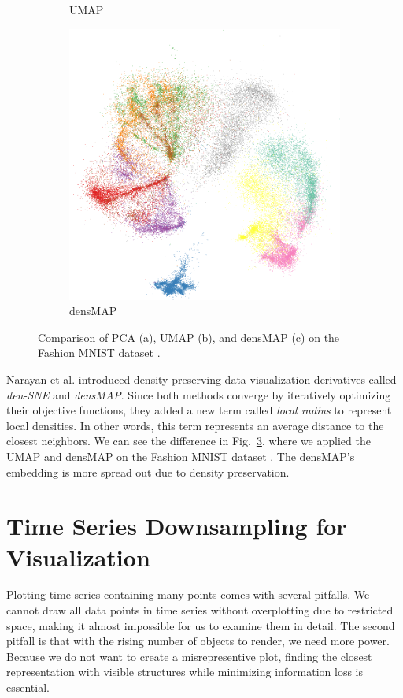 \begin{figure}[ht]
\begin{subfigure}[b]{0.3\textwidth}
        \caption{UMAP}
        \label{fig:fas-umap}
    \end{subfigure}
    \begin{subfigure}[b]{0.3\textwidth}
        \centering
        \includegraphics[width=\textwidth]{img/fashion-densmap.png}
        \caption{densMAP}
        \label{fig:fas-densmap}
    \end{subfigure}
    \caption{Comparison of PCA (a), UMAP (b), and densMAP (c) on the Fashion MNIST dataset \cite{vis:fashion-mnist}.}
    \label{fig:fashion}
\end{figure}

Narayan et al. \cite{vis:densMAP} introduced density-preserving data visualization derivatives called \textit{den-SNE} and \textit{densMAP}. Since both methods converge by iteratively optimizing their objective functions, they added a new term called \textit{local radius} to represent local densities. In other words, this term represents an average distance to the closest neighbors. We can see the difference in Fig.~\ref{fig:fashion}, where we applied the UMAP and densMAP on the Fashion MNIST dataset \cite{vis:fashion-mnist}. The densMAP's embedding is more spread out due to density preservation.

\section{Time Series Downsampling for Visualization}
Plotting time series containing many points comes with several pitfalls. We cannot draw all data points in time series without overplotting due to restricted space, making it almost impossible for us to examine them in detail. The second pitfall is that with the rising number of objects to render, we need more power. Because we do not want to create a misrepresentive plot, finding the closest representation with visible structures while minimizing information loss is essential.

